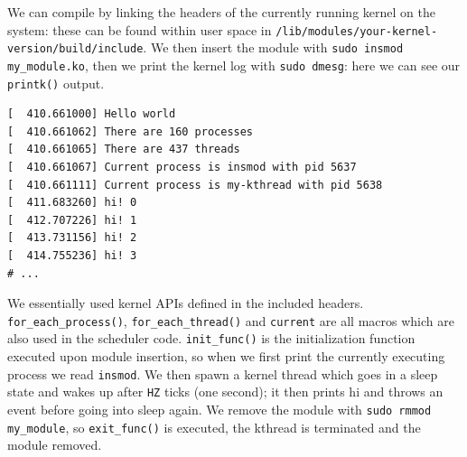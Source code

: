 We can compile by linking the headers of the currently running kernel on the system: these can be found within user space in \verb|/lib/modules/your-kernel-version/build/include|. We then insert the module with \verb|sudo insmod my_module.ko|, then we print the kernel log with \verb|sudo dmesg|: here we can see our \verb|printk()| output.
\begin{Verbatim}
[  410.661000] Hello world
[  410.661062] There are 160 processes
[  410.661065] There are 437 threads
[  410.661067] Current process is insmod with pid 5637
[  410.661111] Current process is my-kthread with pid 5638
[  411.683260] hi! 0
[  412.707226] hi! 1
[  413.731156] hi! 2
[  414.755236] hi! 3
# ...
\end{Verbatim}
We essentially used kernel APIs defined in the included headers. \verb|for_each_process()|, \verb|for_each_thread()| and \verb|current| are all macros which are also used in the scheduler code. \verb|init_func()| is the initialization function executed upon module insertion, so when we first print the currently executing process we read \verb|insmod|. We then spawn a kernel thread which goes in a sleep state and wakes up after \verb|HZ| ticks (one second); it then prints hi and throws an event before going into sleep again. We remove the module with \verb|sudo rmmod my_module|, so \verb|exit_func()| is executed, the kthread is terminated and the module removed.

